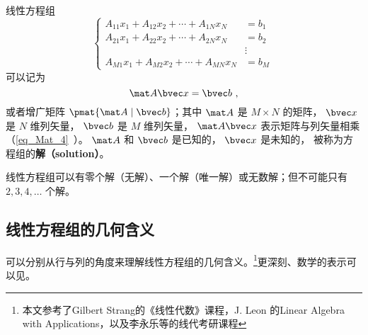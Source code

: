 
\begin{issues}
\issueDraft
\end{issues}


线性方程组
\begin{equation}
\begin{cases}
A_{11} x_1 + A_{12} x_2 + \cdots + A_{1N} x_N &= b_1 \\
A_{21} x_1 + A_{22} x_2 + \cdots + A_{2N} x_N &= b_2 \\
&\vdots \\
A_{M1} x_1 + A_{M2} x_2 + \cdots + A_{MN} x_N &= b_M
\end{cases} ~
\end{equation}
可以记为
\begin{equation}\label{eq_LinEq_1}
\mat A \bvec x = \bvec b~,
\end{equation}
或者增广矩阵 $\pmat{\mat A \mid \bvec b}$；其中 $\mat A$ 是 $M \times N$ 的矩阵， $\bvec x$ 是 $N$ 维列矢量， $\bvec b$ 是 $M$ 维列矢量， $\mat A \bvec x$ 表示矩阵与列矢量相乘（\autoref{eq_Mat_4}~）。 $\mat A$ 和 $\bvec b$ 是已知的， $\bvec x$ 是未知的， 被称为方程组的\textbf{解（solution）}。

线性方程组可以有零个解（无解）、一个解（唯一解）或无数解；但不可能只有 $2,3,4,\dots$ 个解。


\subsection{线性方程组的几何含义}\label{sub_LinEq_2}
可以分别从行与列的角度来理解线性方程组的几何含义。\footnote{本文参考了Gilbert Strang的《线性代数》课程，J. Leon 的Linear Algebra with Applications，以及李永乐等的线代考研课程}更深刻、数学的表示可以见。

